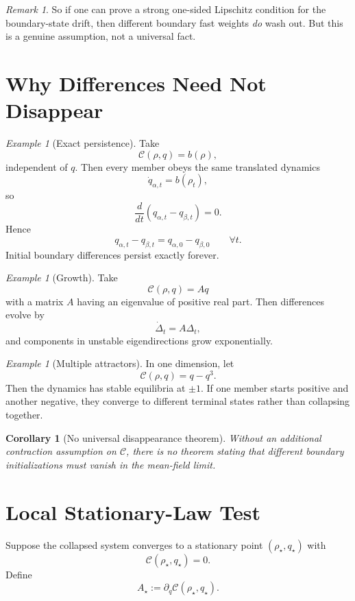 \documentclass[11pt]{article}
\newtheorem{corollary}[theorem]{Corollary}
\theoremstyle{remark}
\newtheorem{remark}[theorem]{Remark}
\newtheorem{example}[theorem]{Example}
\begin{document}
\begin{remark}
So if one can prove a strong one-sided Lipschitz condition for the boundary-state drift, then different boundary fast weights \emph{do} wash out. But this is a genuine assumption, not a universal fact.
\end{remark}

\section{Why Differences Need Not Disappear}

\begin{example}[Exact persistence]
\label{ex:persistence}
Take
\[
\mathcal C(\rho,q)=b(\rho),
\]
independent of $q$. Then every member obeys the same translated dynamics
\[
\dot q_{\alpha,t}=b(\rho_t),
\]
so
\[
\frac{d}{dt}(q_{\alpha,t}-q_{\beta,t})=0.
\]
Hence
\[
q_{\alpha,t}-q_{\beta,t}=q_{\alpha,0}-q_{\beta,0}
\qquad
\forall t.
\]
Initial boundary differences persist exactly forever.
\end{example}

\begin{example}[Growth]
\label{ex:growth}
Take
\[
\mathcal C(\rho,q)=Aq
\]
with a matrix $A$ having an eigenvalue of positive real part. Then differences evolve by
\[
\dot\Delta_t=A\Delta_t,
\]
and components in unstable eigendirections grow exponentially.
\end{example}

\begin{example}[Multiple attractors]
\label{ex:multistable}
In one dimension, let
\[
\mathcal C(\rho,q)=q-q^3.
\]
Then the dynamics has stable equilibria at $\pm 1$. If one member starts positive and another negative, they converge to different terminal states rather than collapsing together.
\end{example}

\begin{corollary}[No universal disappearance theorem]
\label{cor:no-universal}
Without an additional contraction assumption on $\mathcal C$, there is no theorem stating that different boundary initializations must vanish in the mean-field limit.
\end{corollary}

\section{Local Stationary-Law Test}

Suppose the collapsed system converges to a stationary point $(\rho_\star,q_\star)$ with
\[
\mathcal C(\rho_\star,q_\star)=0.
\]
Define
\[
A_\star:=\partial_q \mathcal C(\rho_\star,q_\star).
\]
\end{document}
